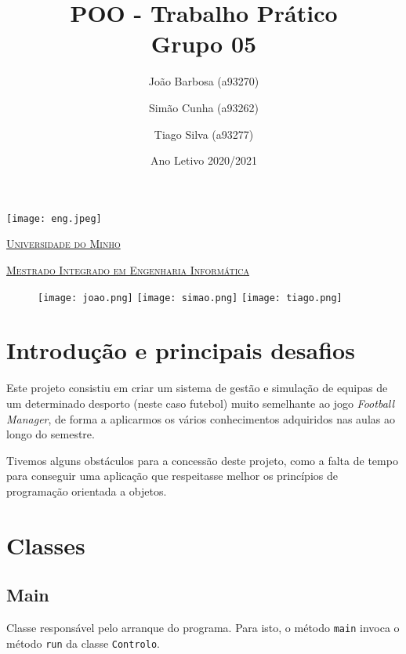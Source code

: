 \documentclass[a4paper]{report}
\title{POO - Trabalho Prático\\
	\large Grupo 05}
\author{João Barbosa (a93270)
	\and Simão Cunha (a93262)
	\and Tiago Silva (a93277)}
\date{Ano Letivo 2020/2021}
\begin{document}
	\begin{minipage}{0.9\linewidth}
        \centering
		\texttt{[image: eng.jpeg]}\par\vspace{1cm}
		\href{https://www.uminho.pt/PT}
		{\scshape\LARGE Universidade do Minho} \par
		\vspace{0.6cm}
		\href{https://miei.di.uminho.pt/}
		{\scshape\Large Mestrado Integrado em Engenharia Informática} \par
		\maketitle
		\begin{figure}[H]
			\texttt{[image: joao.png]}
			\texttt{[image: simao.png]}
			\texttt{[image: tiago.png]}
		\end{figure}
	\end{minipage}
	
	\tableofcontents
	
	\pagebreak
	
	\chapter{Introdução e principais desafios}
%
	Este projeto consistiu em criar um sistema de gestão e simulação de equipas de um determinado
	desporto (neste caso futebol) muito semelhante ao jogo \textit{Football Manager}, de forma a
	aplicarmos os vários conhecimentos adquiridos nas aulas ao longo do semestre.
	
	Tivemos alguns obstáculos para a concessão deste projeto, como a falta de tempo para conseguir uma aplicação que respeitasse melhor os princípios de programação orientada a objetos.
	
	\chapter{Classes}
	\section{Main}
	Classe responsável pelo arranque do programa. Para isto, o método \texttt{main} invoca o método \texttt{run} da classe \texttt{Controlo}.
	
\end{document}
